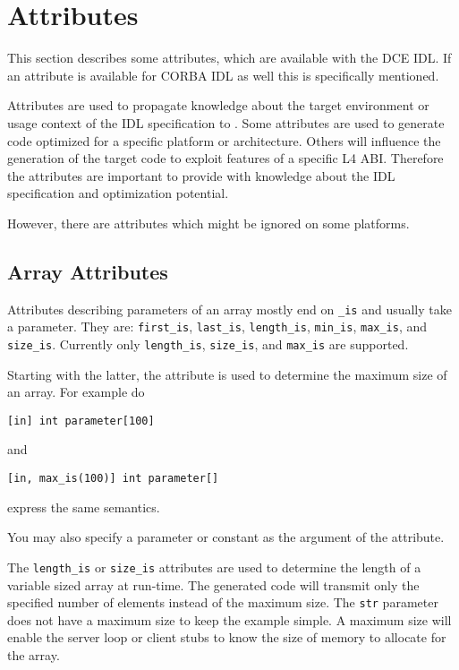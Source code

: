 \section{Attributes}
\label{sec:attributes}

This section describes some attributes, which are available with the DCE IDL.
If an attribute is available for CORBA IDL as well this is specifically
mentioned.

Attributes are used to propagate knowledge about the target environment or
usage context of the IDL specification to \dice{}.  Some attributes are used
to generate code optimized for a specific platform or architecture. Others
will influence the generation of the target code to exploit features of a
specific L4 ABI. Therefore the attributes are important to provide \dice{}
with knowledge about the IDL specification and optimization potential.

However, there are attributes which might be ignored on some platforms.

\subsection{Array Attributes}
Attributes describing parameters of an array mostly end on
\verb|_is| and usually take a parameter. They are:
\verb|first_is|, \verb|last_is|, \verb|length_is|, \verb|min_is|,
\verb|max_is|, and \verb|size_is|. Currently only \verb|length_is|,
\verb|size_is|, and \verb|max_is| are supported.

Starting with the latter, the attribute is used to determine
the maximum size of an array. For example do
\begin{verbatim}
[in] int parameter[100]
\end{verbatim}
and
\begin{verbatim}
[in, max_is(100)] int parameter[]
\end{verbatim}
express the same semantics.

You may also specify a parameter or constant as the argument of the attribute.

The \verb|length_is| or \verb|size_is| attributes are used to determine the
length of a variable sized array at run-time.  The generated code will
transmit only the specified number of elements instead of the maximum size.
The \verb|str| parameter does not have a maximum size to keep the example
simple. A maximum size will enable the server loop or client stubs to know the
size of memory to allocate for the array.


